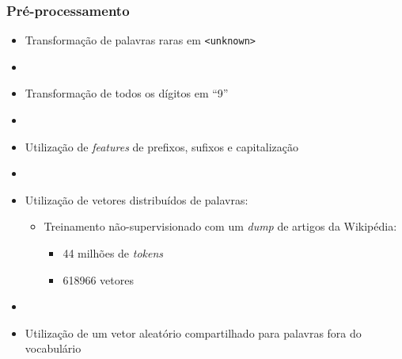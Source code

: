 \documentclass[10pt]{beamer}
\begin{document}
\begin{frame}[fragile]
  \frametitle{Pré-processamento}

  \begin{itemize}

    \item Transformação de palavras raras em \texttt{<unknown>}

    \item[\ ] \ 

    \item Transformação de todos os dígitos em ``9''

    \item[\ ] \ 

    \item Utilização de \textit{features} de prefixos, sufixos e capitalização

    \item[\ ] \ 

    \item Utilização de vetores distribuídos de palavras:

    \begin{itemize}
      \item[-] Treinamento não-supervisionado com um \textit{dump} de artigos da Wikipédia: 
      \begin{itemize}
        \item[-] 44 milhões de \textit{tokens}
        \item[-] 618966 vetores
      \end{itemize}
    \end{itemize}
    
    \item[\ ] \ 

    \item Utilização de um vetor aleatório compartilhado para palavras fora do vocabulário

  \end{itemize}

\end{frame}
\end{document}
